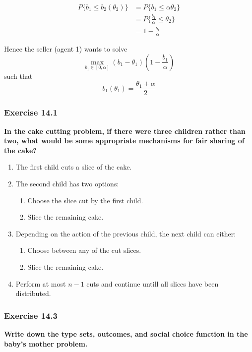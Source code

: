 \documentclass[12pt, a4paper]{article}
\begin{document}
\begin{align*}
	P\{b_1 \leq b_2(\theta_2)\} &= P\{b_1 \leq \alpha\theta_2\} \\
	&= P\{\frac{b_1}{\alpha} \leq \theta_2\} \\
	&= 1 - \frac{b_1}{\alpha}
\end{align*}

Hence the seller (agent 1) wants to solve 
\[\max_{b_1\in[0,\alpha]}(b_1 - \theta_1)\left(1 - \frac{b_1}{\alpha}\right)\]
such that
\[ b_1(\theta_1) = \frac{\theta_1 + \alpha}{2}\]

\subsubsection*{Exercise 14.1}

\textbf{In the cake cutting problem, if there were three children rather than two, what would be some appropriate mechanisms for fair sharing of the cake?}

\begin{enumerate}
	\item The first child cuts a slice of the cake.
	\item The second child has two options:
	\begin{enumerate}
		\item Choose the slice cut by the first child.
		\item Slice the remaining cake.
	\end{enumerate}
	\item Depending on the action of the previous child, the next child can either:
	\begin{enumerate}
		\item Choose between any of the cut slices.
		\item Slice the remaining cake.
	\end{enumerate}
	\item Perform at most $n-1$ cuts and continue untill all slices have been distributed.
\end{enumerate}

\subsubsection*{Exercise 14.3}

\textbf{Write down the type sets, outcomes, and social choice function in the baby’s mother problem.}
\end{document}
